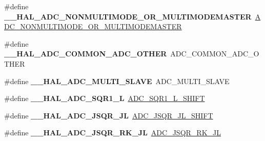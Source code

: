 \begin{DoxyCompactItemize}
\mbox{\label{group___h_a_l___a_d_c___aliased___macros_ga3dceabcf80e81b5a911bbe5ad3ff311a}} 
\#define {\bfseries \+\_\+\+\_\+\+H\+A\+L\+\_\+\+A\+D\+C\+\_\+\+N\+O\+N\+M\+U\+L\+T\+I\+M\+O\+D\+E\+\_\+\+O\+R\+\_\+\+M\+U\+L\+T\+I\+M\+O\+D\+E\+M\+A\+S\+T\+ER}~\hyperlink{group___a_d_c_ex___private___macro_ga0b97545981bf2d7f767a98fd018c78af}{A\+D\+C\+\_\+\+N\+O\+N\+M\+U\+L\+T\+I\+M\+O\+D\+E\+\_\+\+O\+R\+\_\+\+M\+U\+L\+T\+I\+M\+O\+D\+E\+M\+A\+S\+T\+ER}
\item 
\mbox{\label{group___h_a_l___a_d_c___aliased___macros_gafa9bcc01aa0b2a887721e8971031ad0b}} 
\#define {\bfseries \+\_\+\+\_\+\+H\+A\+L\+\_\+\+A\+D\+C\+\_\+\+C\+O\+M\+M\+O\+N\+\_\+\+A\+D\+C\+\_\+\+O\+T\+H\+ER}~A\+D\+C\+\_\+\+C\+O\+M\+M\+O\+N\+\_\+\+A\+D\+C\+\_\+\+O\+T\+H\+ER
\item 
\mbox{\label{group___h_a_l___a_d_c___aliased___macros_gaeff1a570027a91c87a339fd79704c3d2}} 
\#define {\bfseries \+\_\+\+\_\+\+H\+A\+L\+\_\+\+A\+D\+C\+\_\+\+M\+U\+L\+T\+I\+\_\+\+S\+L\+A\+VE}~A\+D\+C\+\_\+\+M\+U\+L\+T\+I\+\_\+\+S\+L\+A\+VE
\item 
\mbox{\label{group___h_a_l___a_d_c___aliased___macros_ga27072f37b7d50adad434a681331755f0}} 
\#define {\bfseries \+\_\+\+\_\+\+H\+A\+L\+\_\+\+A\+D\+C\+\_\+\+S\+Q\+R1\+\_\+L}~\hyperlink{group___a_d_c___private___macros_ga2b29c0e46fa4205f77b15fe7c3425fb8}{A\+D\+C\+\_\+\+S\+Q\+R1\+\_\+\+L\+\_\+\+S\+H\+I\+FT}
\item 
\mbox{\label{group___h_a_l___a_d_c___aliased___macros_ga8764a28e2bb7d6a859fc52074e2ec1ec}} 
\#define {\bfseries \+\_\+\+\_\+\+H\+A\+L\+\_\+\+A\+D\+C\+\_\+\+J\+S\+Q\+R\+\_\+\+JL}~\hyperlink{group___a_d_c___private___macros_gafac7dc7cf0679da43a697df5ca1b79fd}{A\+D\+C\+\_\+\+J\+S\+Q\+R\+\_\+\+J\+L\+\_\+\+S\+H\+I\+FT}
\item 
\mbox{\label{group___h_a_l___a_d_c___aliased___macros_ga51b8c1d68c48edfa958f988845d2ea41}} 
\#define {\bfseries \+\_\+\+\_\+\+H\+A\+L\+\_\+\+A\+D\+C\+\_\+\+J\+S\+Q\+R\+\_\+\+R\+K\+\_\+\+JL}~\hyperlink{group___a_d_c___private___macros_gaa7218626a8bbabdc160a2c5cbe6fb0ab}{A\+D\+C\+\_\+\+J\+S\+Q\+R\+\_\+\+R\+K\+\_\+\+JL}

\end{DoxyCompactItemize}
